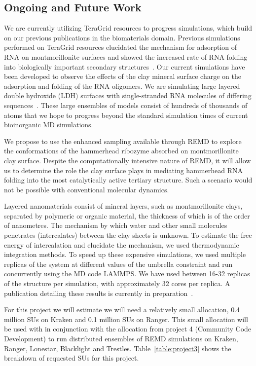\documentclass[a4paper,11pt]{article}
\begin{document}
\subsection{Ongoing and Future Work}
We are currently utilizing TeraGrid resources to progress simulations, which build on our previous publications in the biomaterials domain. Previous simulations performed on TeraGrid resources elucidated the mechanism for adsorption of RNA on montmorillonite surfaces and showed the increased rate of RNA folding into biologically important secondary structures~\cite{Ref9}. Our current simulations have been developed to observe the effects of the clay mineral surface charge on the adsorption and folding of the RNA oligomers. We are simulating large layered double hydroxide (LDH) surfaces with single-stranded RNA molecules of differing sequences~\cite{Ref10}. These large ensembles of models consist of hundreds of thousands of atoms that we hope to progress beyond the standard simulation times of current bioinorganic MD simulations.

We propose to use the enhanced sampling available through REMD to explore the conformations of the hammerhead ribozyme absorbed on montmorillonite clay surface. Despite the computationally intensive nature of REMD, it will allow us to determine the role the clay surface plays in mediating hammerhead RNA folding into the most catalytically active tertiary structure. Such a scenario would not be possible with conventional molecular dynamics.

Layered nanomaterials consist of mineral layers, such as montmorillonite clays, separated by polymeric or organic material, the thickness of which is of the order of nanometres. The mechanism by which water and other small molecules penetrates (intercalates) between the clay sheets is unknown. To estimate the free energy of intercalation and elucidate the mechanism, we used thermodynamic integration methods. To speed up these expensive simulations, we used multiple replicas of the system at different values of the umbrella constraint and run concurrently using the MD code LAMMPS. We have used between 16-32 replicas of the structure per simulation, with approximately 32 cores per replica. A publication detailing these results is currently in preparation~\cite{Ref11}.

For this project we will estimate we will need a relatively small allocation, 0.4 million SUs on Kraken and 0.1 million SUs on Ranger. This small allocation will be used with in conjunction with the allocation from project 4 (Community Code Development) to run distributed ensembles of REMD simulations on Kraken, Ranger, Lonestar, Blacklight and Trestles. Table~\ref{table:project3} shows the breakdown of requested SUs for this project.
\end{document}
